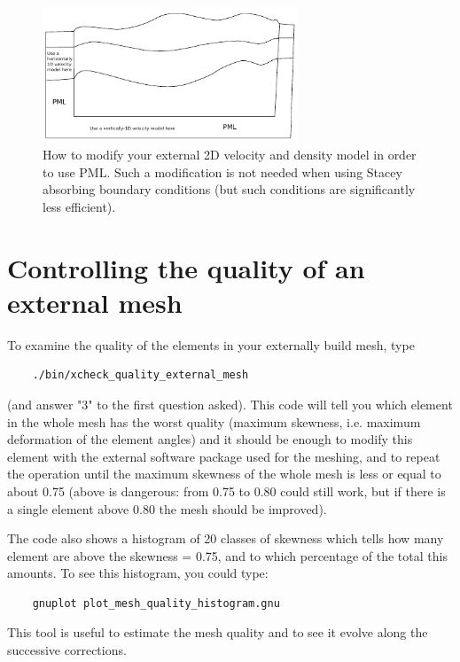 \documentclass[oneside,english,onecolumn,letterpaper]{book}
\begin{document}
\begin{figure}[htbp]
\centering
\includegraphics[width=3in]{figures/how_to_use_PML_when_READ_EXTERNAL_SEP_FILE_is_true}
\caption{How to modify your external 2D velocity and density model in order to use PML.
Such a modification is not needed when using Stacey absorbing boundary conditions (but such conditions
are significantly less efficient).}
\label{fig:modify_external_velocity_model_to_use_PML}
\end{figure}

\section{Controlling the quality of an external mesh}

To examine the quality of the elements in your externally build mesh, type
%
\begin{verbatim}
    ./bin/xcheck_quality_external_mesh
\end{verbatim}
%
(and answer "3" to the first question asked).
This code will tell you which element in the whole mesh has the worst quality (maximum skewness, i.e. maximum deformation of the element angles) and it should be enough to modify this element with the external software package used for the meshing, and
to repeat the operation until the maximum skewness of the whole mesh is less or equal to about 0.75 (above is dangerous: from 0.75 to 0.80 could still work, but if there is a single element above 0.80 the mesh should be improved).

The code also shows a histogram of 20 classes of skewness which tells how many element are above the skewness = 0.75, and to which percentage of the total this amounts. To see this histogram, you could type:
%
\begin{verbatim}
    gnuplot plot_mesh_quality_histogram.gnu
\end{verbatim}
%
This tool is useful to estimate the mesh quality and to see it evolve along the successive corrections.
\end{document}
